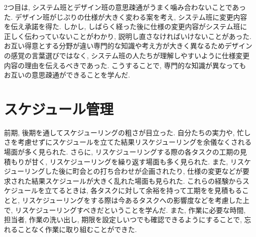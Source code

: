 2つ目は, システム班とデザイン班の意思疎通がうまく噛み合わないことであった.
デザイン班がじぷりの仕様が大きく変わる案を考え, システム班に変更内容を伝え承諾を得た. しかし, しばらく経った後に仕様の変更内容がシステム班に正しく伝わっていないことがわかり,
説明し直さなければいけないことがあった. お互い得意とする分野が違い専門的な知識や考え方が大きく異なるためデザインの感覚の言葉選びではなく,
システム班の人たちが理解しやすいように仕様変更内容の理由を伝えるべきであった. こうすることで, 専門的な知識が異なってもお互いの意思疎通ができることを学んだ.

\section{スケジュール管理}
前期, 後期を通してスケジューリングの粗さが目立った. 自分たちの実力や, 忙しさを考慮せずにスケジュールを立てた結果リスケジューリングを余儀なくされる場面が多く見られた. さらに, リスケジューリングする際の各タスクの工期の見積もりが甘く, リスケジューリングを繰り返す場面も多く見られた. また, リスケジューリングした後に町会との打ち合わせが企画されたり, 仕様の変更などが要求された結果スケジュールが大きく乱れた場面も見られた.
これらの経験からスケジュールを立てるときは, 各タスクに対して余裕を持って工期をを見積もることと, リスケジューリングをする際は今あるタスクへの影響度などを考慮した上で, リスケジューリングすべきだということを学んだ. また, 作業に必要な時間, 担当者, 作業の洗い出し, 期限を設定しいつでも確認できるようにすることで, 忘れることなく作業に取り組むことができた.
